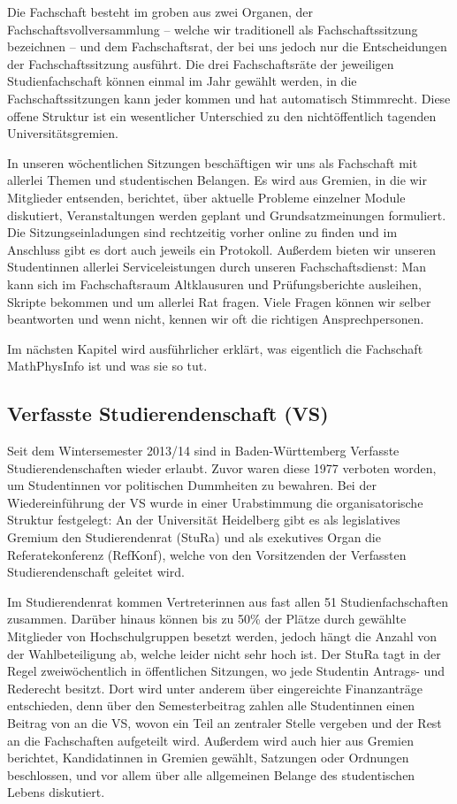 Die Fachschaft besteht im groben aus zwei Organen, der Fachschaftsvollversammlung -- welche wir traditionell als Fachschaftssitzung bezeichnen -- und dem Fachschaftsrat, der bei uns jedoch nur die Entscheidungen der Fachschaftssitzung ausführt. Die drei Fachschaftsräte der jeweiligen Studienfachschaft können einmal im Jahr gewählt werden, in die Fachschaftssitzungen kann jeder kommen und hat automatisch Stimmrecht. Diese offene Struktur ist ein wesentlicher Unterschied zu den nichtöffentlich tagenden Universitätsgremien. 

In unseren wöchentlichen Sitzungen beschäftigen wir uns als Fachschaft mit allerlei Themen und studentischen Belangen. 
Es wird aus Gremien, in die wir Mitglieder entsenden, berichtet, über aktuelle Probleme einzelner Module diskutiert, Veranstaltungen werden geplant und Grundsatzmeinungen formuliert. Die Sitzungseinladungen sind rechtzeitig vorher online zu finden und im Anschluss gibt es dort auch jeweils ein Protokoll. Außerdem bieten wir unseren Studentinnen allerlei Serviceleistungen durch unseren Fachschaftsdienst: Man kann sich im Fachschaftsraum Altklausuren und Prüfungsberichte ausleihen, Skripte bekommen und um allerlei Rat fragen. Viele Fragen können wir selber beantworten und wenn nicht, kennen wir oft die richtigen Ansprechpersonen.

Im nächsten Kapitel wird ausführlicher erklärt, was eigentlich die Fachschaft MathPhysInfo ist und was sie so tut.

\subsection{Verfasste Studierendenschaft (VS)}
Seit dem Wintersemester 2013/14 sind in Baden-Württemberg Verfasste Studierendenschaften wieder erlaubt. 
Zuvor waren diese 1977 verboten worden, um Studentinnen vor politischen Dummheiten zu bewahren. 
Bei der Wiedereinführung der VS wurde in einer Urabstimmung die organisatorische Struktur festgelegt: 
An der Universität Heidelberg gibt es als legislatives Gremium den Studierendenrat (StuRa) und als exekutives Organ die Referatekonferenz (RefKonf), welche von den Vorsitzenden der Verfassten Studierendenschaft geleitet wird.

Im Studierendenrat kommen Vertreterinnen aus fast allen 51 Studienfachschaften zusammen. 
Darüber hinaus können bis zu 50\% der Plätze durch gewählte Mitglieder von Hochschulgruppen besetzt werden, jedoch hängt die Anzahl von der Wahlbeteiligung ab, welche leider nicht sehr hoch ist. 
Der StuRa tagt in der Regel zweiwöchentlich in öffentlichen Sitzungen, wo jede Studentin Antrags- und Rederecht besitzt. 
Dort wird unter anderem über eingereichte Finanzanträge entschieden, denn über den Semesterbeitrag zahlen alle Studentinnen einen Beitrag von  an die VS, wovon ein Teil an zentraler Stelle vergeben und der Rest an die Fachschaften aufgeteilt wird. 
Außerdem wird auch hier aus Gremien berichtet, Kandidatinnen in Gremien gewählt, Satzungen oder Ordnungen beschlossen, und vor allem über alle allgemeinen Belange des studentischen Lebens diskutiert.


